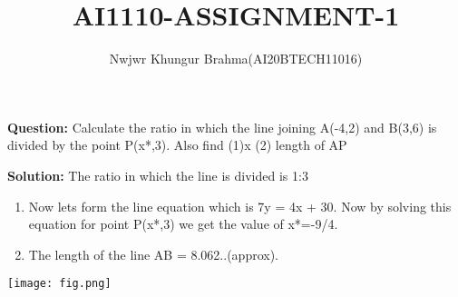 \documentclass[12pt,a4paper]{article}
\title{AI1110-ASSIGNMENT-1}
\author{Nwjwr Khungur Brahma(AI20BTECH11016)}
\begin{document}
\maketitle
\textbf{Question:}
Calculate the ratio in which the line joining A(-4,2) and B(3,6) is divided by the point P(x*,3). Also find (1)x  (2) length of AP

\begin{multicols}{2}
\textbf{Solution:}
The ratio in which the line is divided is 1:3
\begin{enumerate}
\item Now lets form the line equation which is 7y = 4x + 30.
Now by solving this equation for point P(x*,3) we get the value of x*=-9/4.
\item The length of the line AB = 8.062..(approx).
\end{enumerate}
\texttt{[image: fig.png]}
\end{multicols}
\end{document}
